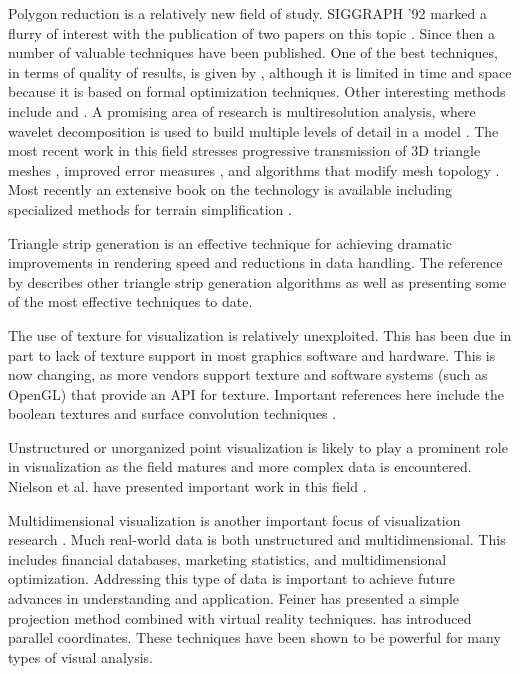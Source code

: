 Polygon reduction is a relatively new field of study. SIGGRAPH '92 marked a flurry of interest with the publication of two papers on this topic \cite{Schroeder92a} \cite{Turk92}. Since then a number of valuable techniques have been published. One of the best techniques, in terms of quality of results, is given by \cite{Hoppe93}, although it is limited in time and space because it is based on formal optimization techniques. Other interesting methods include \cite{Hinker93} and \cite{Rossignac93}. A promising area of research is multiresolution analysis, where wavelet decomposition is used to build multiple levels of detail in a model \cite{Eck95}. The most recent work in this field stresses progressive transmission of 3D triangle meshes \cite{Hoppe96}, improved error measures \cite{Garland97}, and algorithms that modify mesh topology \cite{Popovic97} \cite{Schroeder97}. Most recently an extensive book on the technology is available including specialized methods for terrain simplification \cite{Luebke02}.

Triangle strip generation is an effective technique for achieving dramatic improvements in rendering speed and reductions in data handling. The reference by \cite{Evans96} describes other triangle strip generation algorithms as well as presenting some of the most effective techniques to date.

The use of texture for visualization is relatively unexploited. This has been due in part to lack of texture support in most graphics software and hardware. This is now changing, as more vendors support texture and software systems (such as OpenGL) that provide an API for texture. Important references here include the boolean textures \cite{Lorensen93} and surface convolution techniques \cite{Cabral93} \cite{Stalling95}.

Unstructured or unorganized point visualization is likely to play a prominent role in visualization as the field matures and more complex data is encountered. Nielson et al. have presented important work in this field \cite{Nielson91a}.

Multidimensional visualization is another important focus of visualization research \cite{Bergeron89} \cite{Mihalisin90}. Much real-world data is both unstructured and multidimensional. This includes financial databases, marketing statistics, and multidimensional optimization. Addressing this type of data is important to achieve future advances in understanding and application. Feiner \cite{Feiner90} has presented a simple projection method combined with virtual reality techniques. \cite{Inselberg87} has introduced parallel coordinates. These techniques have been shown to be powerful for many types of visual analysis.

